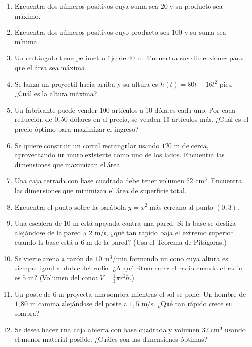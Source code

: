 \documentclass[12pt, a4paper]{article}
\begin{document}
\begin{enumerate}[leftmargin=*, resume]
  \item \facil{} Encuentra dos números positivos cuya suma sea $20$ y su producto sea máximo.

  \item \facil{} Encuentra dos números positivos cuyo producto sea $100$ y su suma sea mínima.

  \item \medio{} Un rectángulo tiene perímetro fijo de $40$ m. Encuentra sus dimensiones para que el área sea máxima.

  \item \medio{} Se lanza un proyectil hacia arriba y su altura es $h(t) = 80t - 16t^2$ pies. ¿Cuál es la altura máxima?

  \item \medio{} Un fabricante puede vender $100$ artículos a $10$ dólares cada uno. Por cada reducción de $0{,}50$ dólares en el precio, se venden 10 artículos más. ¿Cuál es el precio óptimo para maximizar el ingreso?

  \item \medio{} Se quiere construir un corral rectangular usando $120$ m de cerca, aprovechando un muro existente como uno de los lados. Encuentra las dimensiones que maximizan el área.

  \item \dificil{} Una caja cerrada con base cuadrada debe tener volumen $32$ cm$^3$. Encuentra las dimensiones que minimizan el área de superficie total.

  \item \dificil{} Encuentra el punto sobre la parábola $y = x^2$ más cercano al punto $(0, 3)$.

  \item \dificil{} Una escalera de $10$ m está apoyada contra una pared. Si la base se desliza alejándose de la pared a $2$ m/s, ¿qué tan rápido baja el extremo superior cuando la base está a $6$ m de la pared? (Usa el Teorema de Pitágoras.)

  \item \dificil{} Se vierte arena a razón de $10$ m$^3$/min formando un cono cuya altura es siempre igual al doble del radio. ¿A qué ritmo crece el radio cuando el radio es $5$ m? (Volumen del cono: $V = \frac{1}{3}\pi r^2 h$.)

  \item \dificil{} Un poste de $6$ m proyecta una sombra mientras el sol se pone. Un hombre de $1{,}80$ m camina alejándose del poste a $1{,}5$ m/s. ¿Qué tan rápido crece su sombra?

  \item \dificil{} Se desea hacer una caja abierta con base cuadrada y volumen $32$ cm$^3$ usando el menor material posible. ¿Cuáles son las dimensiones óptimas?
\end{enumerate}
\end{document}
